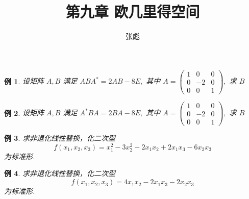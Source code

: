 \documentclass[13pt]{beamer}
\newtheorem{exa}{例}
\begin{document}

\title[]{第九章 \quad  欧几里得空间}
\author[]{{\large 张彪}\\  }

\date{}


\AtBeginSection[]
{
	\setcounter{exa}{0}
	\setcounter{equation}{0}
}





\setcounter{exa}{0}
\begin{frame}
\begin{exa}
	设矩阵 $A, B$ 满足 $A B A^{*}=2 A B-8 E,$ 其中 $A=\left(\begin{array}{ccc}1 & 0 & 0 \\ 0 & -2 & 0 \\ 0 & 0 & 1\end{array}\right),$ 求 $B$
\end{exa}

\begin{exa}
	设矩阵 $A, B$ 满足 $A^{*} B A=2 B A-8 E,$ 其中 $A=\left(\begin{array}{ccc}1 & 0 & 0 \\ 0 & -2 & 0 \\ 0 & 0 & 1\end{array}\right),$ 求 $B$
\end{exa}
\end{frame}


\setcounter{exa}{0}

\begin{frame}
\begin{exa}
求非退化线性替换，化二次型 $$f\left(x_{1}, x_{2}, x_{3}\right)=x_{1}^{2}-3 x_{2}^{2}-2 x_{1} x_{2}+2 x_{1} x_{3}-6 x_{2} x_{3}$$ 为标准形.
\end{exa}
\begin{exa}
求非退化线性替换，化二次型 $$f\left(x_{1}, x_{2}, x_{3}\right)=4 x_{1} x_{2}-2 x_{1} x_{3}-2 x_{2} x_{3}$$ 为标准形.
\end{exa}
\end{frame}
\end{document}
